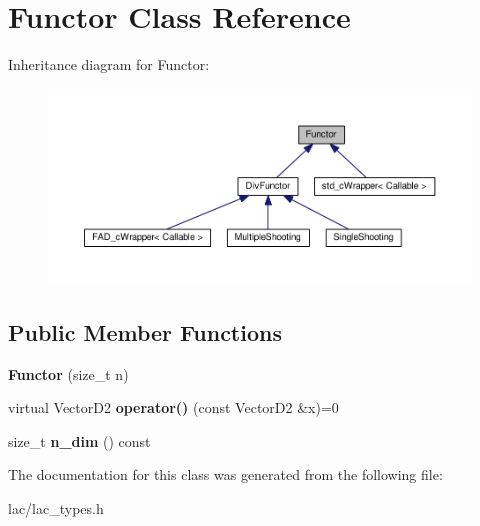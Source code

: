 \hypertarget{classFunctor}{}\section{Functor Class Reference}
\label{classFunctor}


Inheritance diagram for Functor\+:\nopagebreak
\begin{figure}[H]
\begin{center}
\leavevmode
\includegraphics[width=350pt]{classFunctor__inherit__graph}
\end{center}
\end{figure}
\subsection*{Public Member Functions}
\begin{DoxyCompactItemize}
\item 
\mbox{\label{classFunctor_ad1809c2a1db2ab1cd607af4b1c8aaeb0}} 
{\bfseries Functor} (size\+\_\+t n)
\item 
\mbox{\label{classFunctor_a79e7aeb507e6d8715c1dde8f5c0d598b}} 
virtual Vector\+D2 {\bfseries operator()} (const Vector\+D2 \&x)=0
\item 
\mbox{\label{classFunctor_a840b2921ae2622a4939098f530582ebc}} 
size\+\_\+t {\bfseries n\+\_\+dim} () const
\end{DoxyCompactItemize}


The documentation for this class was generated from the following file\+:\begin{DoxyCompactItemize}
\item 
lac/lac\+\_\+types.\+h\end{DoxyCompactItemize}
